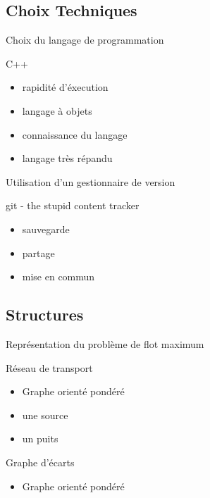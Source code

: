 \subsection{Choix Techniques}

\begin{frame}{Choix du langage de programmation}
	\begin{block}{C++}
  	\begin{itemize}
    	\item rapidité d'éxecution
    	\item langage à objets
    	\item connaissance du langage
    	\item langage très répandu
  	\end{itemize}
	\end{block}
\end{frame}

\begin{frame}{Utilisation d'un gestionnaire de version}
	\begin{block}{git - the stupid content tracker}
  	\begin{itemize}
    	\item sauvegarde
    	\item partage
    	\item mise en commun
  	\end{itemize}
	\end{block}
\end{frame}

\subsection{Structures}
\begin{frame}{Représentation du problème de flot maximum}
	\begin{block}{Réseau de transport}
  	\begin{itemize}
    	\item Graphe orienté pondéré
    	\item une source
    	\item un puits
  	\end{itemize}
	\end{block}
	\begin{block}{Graphe d'écarts}
  	\begin{itemize}
    	\item Graphe orienté pondéré
  	\end{itemize}
	\end{block}
\end{frame}


